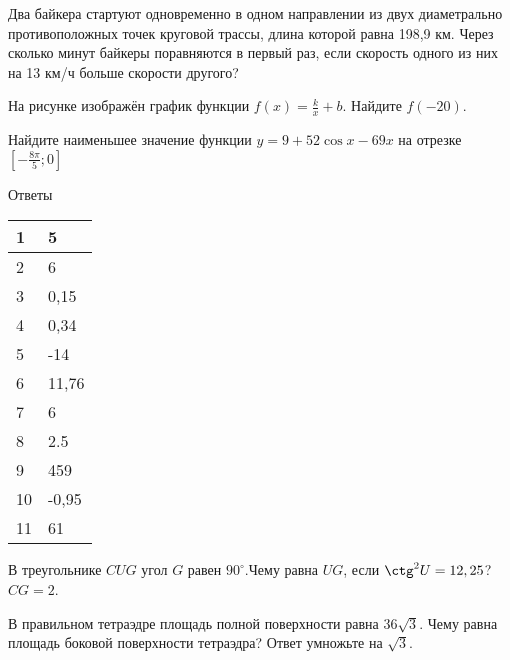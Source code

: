 \documentclass[twocolumn]{article}
\begin{document}
\begin{taskBN}{9}
Два байкера стартуют одновременно в одном направлении из двух диаметрально противоположных точек круговой трассы, длина которой равна 198,9 км. Через сколько минут байкеры поравняются в первый раз, если скорость одного из них на 13 км/ч больше скорости другого? 
\end{taskBN}

\begin{taskBN}{10}
На рисунке изображён график функции $f(x)=\frac{k}{x}+b$. Найдите $f(-20)$.\vspace{2.5cm}
\end{taskBN}

\begin{taskBN}{11}
Найдите наименьшее значение функции $y = 9+52\cos x-69x$ на отрезке $[-\frac{8\pi}{5};0]$
\end{taskBN}

\newpage
 Ответы

\begin{table}[h]\begin{tabular}{|l|l|}
\hline
1 & 5
\\
\hline
2 & 6
\\
\hline
3 & 0,15
\\
\hline
4 & 0,34
\\
\hline
5 & -14
\\
\hline
6 & 11,76
\\
\hline
7 & 6
\\
\hline
8 & 2.5
\\
\hline
9 & 459
\\
\hline
10 & -0,95
\\
\hline
11 & 61
\\
\hline
\end{tabular}\end{table}



\newpage




\cleardoublepage
\def\examvart{Вариант 18.3}
\normalsize

\startpartone
\large




\begin{taskBN}{1}
В треугольнике $CUG$ угол $G$ равен $90^\circ$.Чему равна  $UG$, если $\ctg^2{U}=12,25$?  $CG=2$. 
\end{taskBN}

\begin{taskBN}{2}
В правильном тетраэдре площадь полной поверхности равна $36\sqrt{3}$. Чему равна площадь боковой поверхности тетраэдра? Ответ умножьте на $\sqrt{3}$.\vspace{2.5cm}
\end{taskBN}
\end{document}
